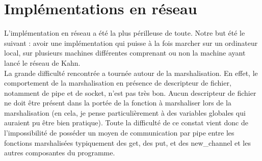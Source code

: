 \documentclass[a4paper, 12pt, twoside]{report}
\begin{document}
\section{Implémentations en réseau}

L'implémentation en réseau a été la plus périlleuse de toute. Notre but été le suivant : avoir une implémentation qui puisse 
à la fois marcher sur un ordinateur local, sur plusieurs machines différentes comprenant ou non la machine ayant lancé le réseau 
de Kahn.\\

La grande difficulté rencontrée a tournée autour de la marshalisation. En effet, le comportement de la marshalisation en 
présence de descripteur de fichier, notamment de pipe et de socket, n'est pas très bon. Aucun descripteur de fichier ne doit 
être présent dans la portée de la fonction à marshaliser lors de la marshalisation (en cela, je pense particulièrement à des 
variables globales qui auraient pu être bien pratique). Toute la difficulté de ce constat vient donc de l'impossibilité de 
posséder un moyen de communication par pipe entre les fonctions marshalisées typiquement des get, des put, et des new_channel 
et les autres composantes du programme.\\
\end{document}
